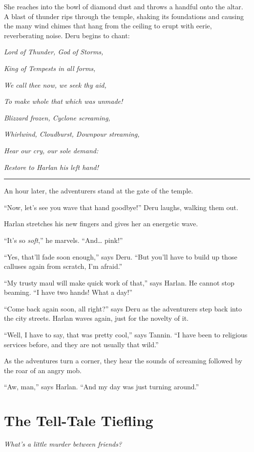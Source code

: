 \documentclass[smalldemyvopaper,11pt,twoside,onecolumn,openright,extrafontsizes]{memoir}
\newcommand{\chapdesc}[1]{
    \begin{flushright}
    \emph{{#1}}
    \end{flushright}
    \vspace{26pt}
}
\begin{document}
She reaches into the bowl of diamond dust and throws a handful onto the
altar. A blast of thunder rips through the temple, shaking its
foundations and causing the many wind chimes that hang from the ceiling
to erupt with eerie, reverberating noise. Deru begins to chant:

\emph{Lord of Thunder, God of Storms,}

\emph{King of Tempests in all forms,}

\emph{We call thee now, we seek thy aid,}

\emph{To make whole that which was unmade!}

\emph{Blizzard frozen, Cyclone screaming,}

\emph{Whirlwind, Cloudburst, Downpour streaming,}

\emph{Hear our cry, our sole demand:}

\emph{Restore to Harlan his left hand!}

\begin{center}\rule{0.5\linewidth}{\linethickness}\end{center}

An hour later, the adventurers stand at the gate of the temple.

``Now, let's see you wave that hand goodbye!'' Deru laughs, walking them
out.

Harlan stretches his new fingers and gives her an energetic wave.

``It's so \emph{soft},'' he marvels. ``And\ldots{} pink!''

``Yes, that'll fade soon enough,'' says Deru. ``But you'll have to build
up those calluses again from scratch, I'm afraid.''

``My trusty maul will make quick work of that,'' says Harlan. He cannot
stop beaming. ``I have two hands! What a day!''

``Come back again soon, all right?'' says Deru as the adventurers step
back into the city streets. Harlan waves again, just for the novelty of
it.

``Well, I have to say, that was pretty cool,'' says Tannin. ``I have
been to religious services before, and they are not usually that wild.''

As the adventures turn a corner, they hear the sounds of screaming
followed by the roar of an angry mob.

``Aw, man,'' says Harlan. ``And my day was just turning around.''


\chapter{The Tell-Tale Tiefling}
\chapdesc{What's a little murder between friends?}
\end{document}
